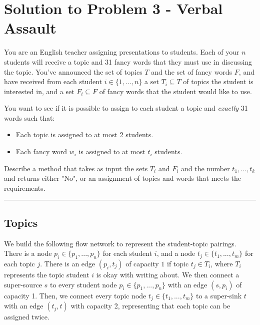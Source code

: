 \documentclass[11pt]{article}
\begin{document}
\pagebreak

\section*{Solution to Problem 3 - Verbal Assault}

You are an English teacher assigning presentations to students. Each of your $n$ students will receive a topic and 31 fancy words that they must use in discussing the topic. You've announced the set of topics $T$ and the set of fancy words $F$, and have received from each student $i \in \{1, ..., n\}$ a set $T_i \subseteq T$ of topics the student is interested in, and a set $F_i \subseteq F$ of fancy words that the student would like to use.

You want to see if it is possible to assign to each student a topic and \textit{exactly} 31 words such that:
\begin{itemize}
	\item Each topic is assigned to at most 2 students.
	\item Each fancy word $w_i$ is assigned to at most $t_i$ students.
\end{itemize}

Describe a method that takes as input the sets $T_i$ and $F_i$ and the number $t_1, ..., t_k$ and returns either "No", or an assignment of topics and words that meets the requirements.

\noindent\rule{17cm}{0.4pt}

\subsection*{Topics}
We build the following flow network to represent the student-topic pairings. There is a node $p_i \in \{p_1, ..., p_n\}$ for each student $i$, and a node $t_j \in \{t_1, ..., t_m\}$ for each topic $j$. There is an edge $(p_i, t_j)$ of capacity $1$ if topic $t_j \in T_i$, where $T_i$ represents the topic student $i$ is okay with writing about. We then connect a super-source $s$ to every student node $p_i \in \{p_1, ..., p_n\}$ with an edge $(s, p_i)$ of capacity 1. Then, we connect every topic node $t_j \in \{t_1, ..., t_m\}$ to a super-sink $t$ with an edge $(t_j, t)$ with capacity 2, representing that each topic can be assigned twice.
\end{document}
